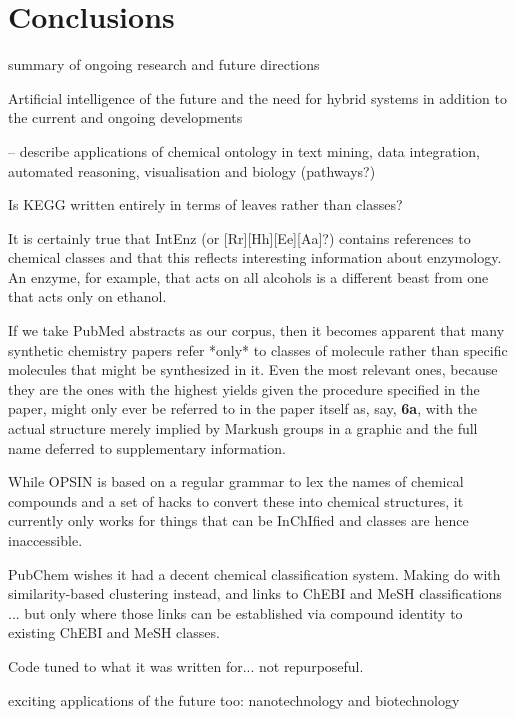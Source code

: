 \documentclass[10pt]{bmc_article}
\newenvironment{bmcformat}{\baselineskip20pt\sloppy\setboolean{publ}{false}}{\baselineskip20pt\sloppy}
\begin{document}
\begin{bmcformat}
\section*{Conclusions}

summary of ongoing research and future directions

Artificial intelligence of the future and the need for hybrid systems in addition to the current and ongoing developments 


-- describe applications of chemical ontology in text mining, data integration, automated reasoning, visualisation and biology (pathways?)

Is KEGG written entirely in terms of leaves rather than classes? 

It is certainly true that IntEnz (or [Rr][Hh][Ee][Aa]?) contains references to chemical classes and that this reflects interesting information about enzymology.
An enzyme, for example, that acts on all alcohols is a different beast from one that acts only on ethanol.

If we take PubMed abstracts as our corpus, then it becomes apparent that many synthetic chemistry papers refer *only* to classes of molecule rather than specific molecules that might be synthesized in it.  Even the most relevant ones, because they are the ones with the highest yields given the procedure specified in the paper, might only ever be referred to in the paper itself as, say, \textbf{6a}, with the actual structure merely implied by Markush groups in a graphic and the full name deferred to supplementary information.

While OPSIN is based on a regular grammar to lex the names of chemical compounds and a set of hacks to convert these into chemical structures, it currently only works for things that can be InChIfied and classes are hence inaccessible.

PubChem wishes it had a decent chemical classification system. Making do with similarity-based clustering instead, and links to ChEBI and MeSH classifications ... but only where those links can be established via compound identity to existing ChEBI and MeSH classes. 

Code tuned to what it was written for... not repurposeful. 

exciting applications of the future too: nanotechnology and biotechnology 




\end{bmcformat}
\end{document}
